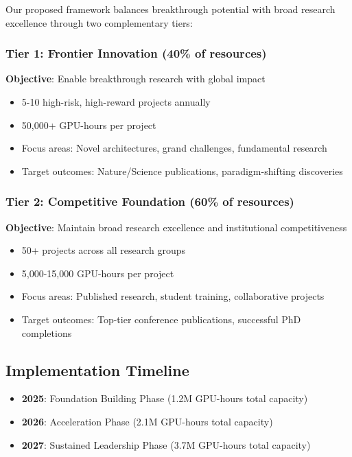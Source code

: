 \documentclass{article}
\begin{document}
Our proposed framework balances breakthrough potential with broad research excellence through two complementary tiers:



\subsubsection{Tier 1: Frontier Innovation (40\% of resources)}

\textbf{Objective}: Enable breakthrough research with global impact

\begin{itemize}
\item 5-10 high-risk, high-reward projects annually
\item 50,000+ GPU-hours per project
\item Focus areas: Novel architectures, grand challenges, fundamental research
\item Target outcomes: Nature/Science publications, paradigm-shifting discoveries
\end{itemize}

\subsubsection{Tier 2: Competitive Foundation (60\% of resources)}

\textbf{Objective}: Maintain broad research excellence and institutional competitiveness

\begin{itemize}
\item 50+ projects across all research groups
\item 5,000-15,000 GPU-hours per project
\item Focus areas: Published research, student training, collaborative projects
\item Target outcomes: Top-tier conference publications, successful PhD completions
\end{itemize}

\subsection{Implementation Timeline}

\begin{itemize}
\item \textbf{2025}: Foundation Building Phase (1.2M GPU-hours total capacity)
\item \textbf{2026}: Acceleration Phase (2.1M GPU-hours total capacity)
\item \textbf{2027}: Sustained Leadership Phase (3.7M GPU-hours total capacity)
\end{itemize}
\end{document}
